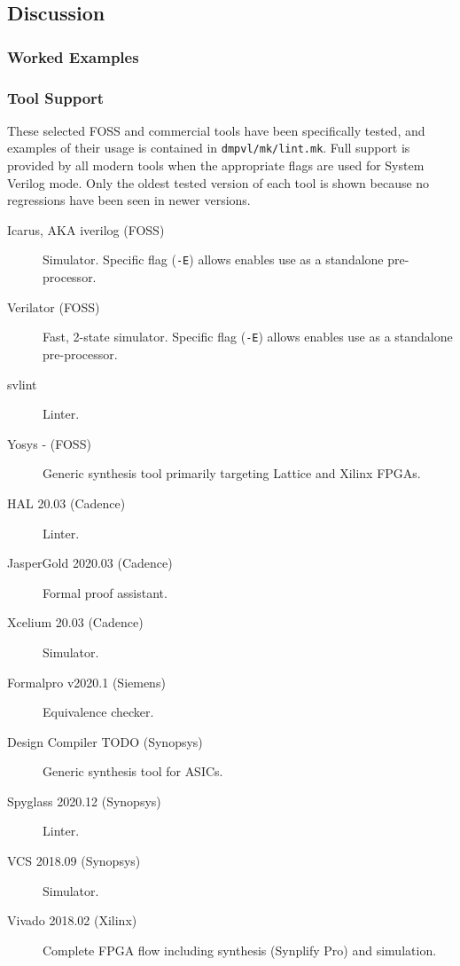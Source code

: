 \documentclass[a4paper]{article}
\begin{document}
\subsection{Discussion} %
\label{sec:BoringFlops_discussion}

\subsubsection{Worked Examples} %
\label{sec:BoringFlops_workedExamples}


\subsubsection{Tool Support} %
\label{sec:BoringFlops_toolSupport}
These selected \gls{FOSS} and commercial tools have been specifically tested,
and examples of their usage is contained in \texttt{dmpvl/mk/lint.mk}.
Full support is provided by all modern tools when the appropriate flags are
used for System Verilog mode.
Only the oldest tested version of each tool is shown because no regressions
have been seen in newer versions.

\begin{description}
\item[Icarus, AKA iverilog (\gls{FOSS})]
  Simulator.
  Specific flag (\texttt{-E}) allows enables use as a standalone pre-processor.
\item[Verilator (\gls{FOSS})]
  Fast, 2-state simulator.
  Specific flag (\texttt{-E}) allows enables use as a standalone pre-processor.
\item[svlint]
  Linter.
\item[Yosys - (\gls{FOSS})]
  Generic synthesis tool primarily targeting Lattice and Xilinx \glspl{FPGA}.
\item[HAL 20.03 (Cadence)]
  Linter.
\item[JasperGold 2020.03 (Cadence)]
  Formal proof assistant.
\item[Xcelium 20.03 (Cadence)]
  Simulator.
\item[Formalpro v2020.1 (Siemens)]
  Equivalence checker.
\item[Design Compiler TODO (Synopsys)]
  Generic synthesis tool for \glspl{ASIC}.
\item[Spyglass 2020.12 (Synopsys)]
  Linter.
\item[VCS 2018.09 (Synopsys)]
  Simulator.
\item[Vivado 2018.02 (Xilinx)]
  Complete \gls{FPGA} flow including synthesis (Synplify Pro) and simulation.
\end{description}
\end{document}
